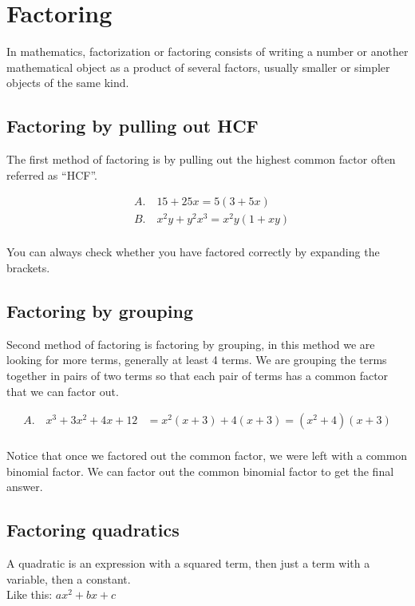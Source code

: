 \section{Factoring}
In mathematics, factorization or factoring consists of writing a number or another mathematical object as a product of several factors, usually smaller or simpler objects of the same kind. \\

\subsection{Factoring by pulling out HCF}

The first method of factoring is by pulling out the highest common factor often referred as “HCF”. 

\begin{align*}
    &A. \quad 15 + 25x = 5(3 + 5x) \\
    &B. \quad x^2y + y^2x^3 = x^2y(1 + xy) \\
\end{align*}

You can always check whether you have factored correctly by expanding the brackets.

\subsection{Factoring by grouping}
Second method of factoring is factoring by grouping, in this method we are looking for more terms, generally at least 4 terms. We are grouping the terms together in pairs of two terms so that each pair of terms has a common factor that we can factor out. 

\begin{align*}
    A. \quad x^3 + 3x^2 + 4x + 12 &= x^2(x + 3) + 4(x + 3) = (x^2 + 4)(x + 3) \\
\end{align*}

Notice that once we factored out the common factor, we were left with a common binomial factor. We can factor out the common binomial factor to get the final answer.

\subsection{Factoring quadratics}
A quadratic is an expression with a squared term, then just a term with a variable, then a constant. 
\\ Like this: $ax^2 + bx + c$ 

